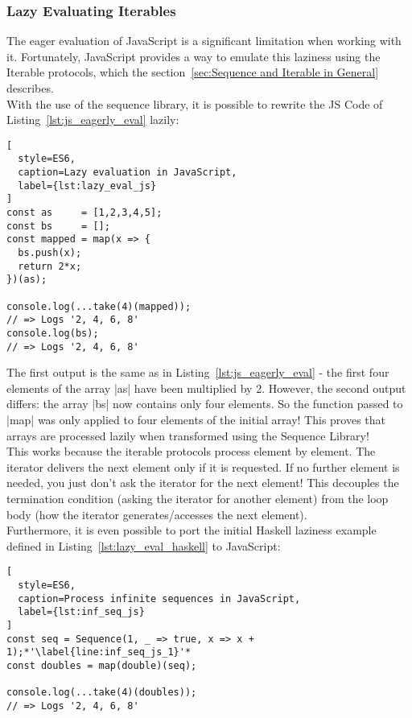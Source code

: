 \subsubsection{Lazy Evaluating Iterables} %
\label{Lazy Evaluate Iterables}

The eager evaluation of JavaScript is a significant limitation when working with it.
Fortunately, JavaScript provides a way to emulate this laziness using the
Iterable protocols, which the section~\ref{sec:Sequence and Iterable in General}
describes. \\ 

With the use of the sequence library, it is possible to rewrite the JS Code of
Listing~\ref{lst:js_eagerly_eval} lazily:


\begin{lstlisting}[
  style=ES6,
  caption=Lazy evaluation in JavaScript,
  label={lst:lazy_eval_js}
]
const as     = [1,2,3,4,5];
const bs     = [];
const mapped = map(x => {
  bs.push(x);
  return 2*x;
})(as);

console.log(...take(4)(mapped));
// => Logs '2, 4, 6, 8'
console.log(bs);
// => Logs '2, 4, 6, 8'
\end{lstlisting}

The first output is the same as in Listing~\ref{lst:js_eagerly_eval} - the
first four elements of the array |as| have been multiplied by 2. However, the
second output differs: the array |bs| now contains only four elements. So the
function passed to |map| was only applied to four elements of the initial
array! This proves that arrays are processed lazily when transformed using the
Sequence Library!\\
This works because the iterable protocols process element by element. The
iterator delivers the next element only if it is requested. If no further
element is needed, you just don't ask the iterator for the next element! This
decouples the termination condition (asking the iterator for another element)
from the loop body (how the iterator generates/accesses the next element).\\

Furthermore, it is even possible to port the initial Haskell laziness
example defined in Listing~\ref{lst:lazy_eval_haskell} to JavaScript:
\begin{lstlisting}[
  style=ES6,
  caption=Process infinite sequences in JavaScript,
  label={lst:inf_seq_js}
]
const seq = Sequence(1, _ => true, x => x + 1);*'\label{line:inf_seq_js_1}'*
const doubles = map(double)(seq);

console.log(...take(4)(doubles));
// => Logs '2, 4, 6, 8'
\end{lstlisting}

